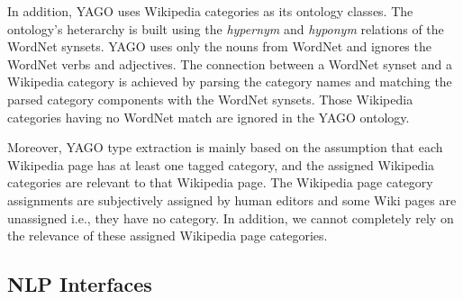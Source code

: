 In addition, YAGO uses Wikipedia categories as its ontology classes. The
ontology's heterarchy is built using the \textit{hypernym} and \textit{hyponym}
relations of the WordNet synsets. YAGO uses only the nouns from WordNet and
ignores the WordNet verbs and adjectives. The connection between a WordNet
synset and a Wikipedia category is achieved by parsing the category names and
matching the parsed category components with the WordNet
synsets\cite{Suchanek2009phd}. Those Wikipedia categories having no WordNet
match are ignored in the YAGO ontology.  
  
Moreover, YAGO type extraction is mainly based on the assumption that
each Wikipedia page has at least one tagged category, and the assigned Wikipedia
categories are relevant to that Wikipedia page. The Wikipedia page category
assignments are subjectively assigned by human editors and some Wiki pages are
unassigned i.e., they have no category. In addition, we cannot completely rely
on the relevance of these assigned Wikipedia page categories. 


\subsection{NLP Interfaces} 
